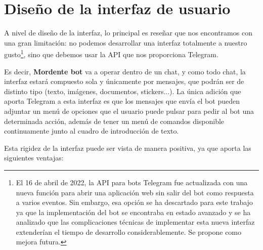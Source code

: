 \chapter{Diseño de la interfaz de usuario}

A nivel de diseño de la interfaz, lo principal es reseñar que nos encontramos con una gran limitación: no podemos desarrollar una interfaz totalmente a nuestro gusto\footnote{El 16 de abril de 2022, la API para bots Telegram fue actualizada\cite{telegramWebappUpdate} con una nueva función para abrir una aplicación web sin salir del bot como respuesta a varios eventos. Sin embargo, esa opción se ha descartado para este trabajo ya que la implementación del bot se encontraba en estado avanzado y se ha analizado que las complicaciones técnicas de implementar esta nueva interfaz extenderían el tiempo de desarrollo considerablemente. Se propone como mejora futura.}, sino que debemos usar la API que nos proporciona Telegram.

Es decir, \textbf{Mordente bot} va a operar dentro de un chat, y como todo chat, la interfaz estará compuesto sola y únicamente por mensajes, que podrán ser de distinto tipo (texto, imágenes, documentos, stickers...). La única adición que aporta Telegram a esta interfaz es que los mensajes que envía el bot pueden adjuntar un menú de opciones que el usuario puede pulsar para pedir al bot una determinada acción, además de tener un menú de comandos disponible continuamente junto al cuadro de introducción de texto.

Esta rigidez de la interfaz puede ser vista de manera positiva, ya que aporta las siguientes ventajas:

